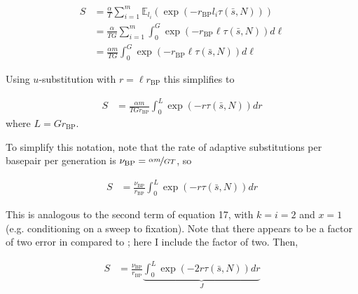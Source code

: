 \documentclass[11pt]{article}
\newcommand{\E}{\mathbb{E}}
\begin{document}
\begin{align}
  S &= \frac{\alpha}{T} \sum_{i=1}^m \E_{l_i} \left(\exp(-r_\text{BP} l_i \tau(\bar{s}, N)) \right) \\
    &= \frac{\alpha}{T G} \sum_{i=1}^m \int_0^{G} \exp(-r_\text{BP} \ell \tau(\bar{s}, N)) d\ell \\
    &= \frac{\alpha m}{T G} \int_0^{G} \exp(-r_\text{BP} \ell \tau(\bar{s}, N)) d\ell
\end{align}

Using $u$-substitution with $r = \ell r_\text{BP}$ this simplifies to

\begin{align}
  S &= \frac{\alpha m}{T G r_\text{BP}} \int_0^{L} \exp(-r \tau(\bar{s}, N)) dr
\end{align}
%
where $L = G r_\text{BP}$. 

To simplify this notation, note that the rate of adaptive substitutions per
basepair per generation is $\nu_\text{BP} = \nicefrac{\alpha m}{GT}$, so 

\begin{align}
  S &= \frac{\nu_\text{BP}}{r_\text{BP}} \int_0^{L} \exp(-r \tau(\bar{s}, N)) dr
\end{align}

This is analogous to the second term of \textcite{Coop2012-cd} equation 17,
with $k = i = 2$ and $x = 1$ (e.g.  conditioning on a sweep to fixation). Note
that there appears to be a factor of two error in \textcite{Elyashiv2016-vt}
compared to \textcite{Coop2012-cd}; here I include the factor of two.  Then,

\begin{align}
  S &= \frac{\nu_\text{BP}}{r_\text{BP}} \underbrace{\int_0^{L} \exp(-2r \tau(\bar{s}, N)) dr}_{J}
\end{align}
%
\end{document}
